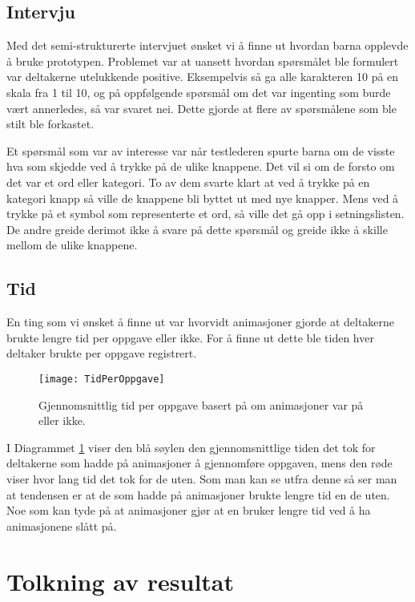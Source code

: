 \subsection{Intervju} 
 
Med det semi-strukturerte intervjuet ønsket vi å finne ut hvordan barna opplevde å bruke prototypen. Problemet var at uansett hvordan spørsmålet ble formulert var deltakerne utelukkende positive. Eksempelvis så ga alle karakteren 10 på en skala fra 1 til 10, og på oppfølgende spørsmål om det var ingenting som burde vært annerledes, så var svaret nei. Dette gjorde at flere av spørsmålene som ble stilt ble forkastet.  
 
Et spørsmål som var av interesse var når testlederen spurte barna om de visste hva som skjedde ved å trykke på de ulike knappene. Det vil si om de forsto om det var et ord eller kategori. To av dem svarte klart at ved å trykke på en kategori knapp så ville de knappene bli byttet ut med nye knapper. Mens ved å trykke på et symbol som representerte et ord, så ville det gå opp i setningslisten. De andre greide derimot ikke å svare på dette spørsmål og greide ikke å skille mellom de ulike knappene. 
 

\subsection{Tid} 
 
 
En ting som vi ønsket å finne ut var hvorvidt animasjoner gjorde at deltakerne brukte lengre tid per oppgave eller ikke. For å finne ut dette ble tiden hver deltaker brukte per oppgave registrert.  
 
 
\begin{figure}[ht!] 
\centering 
\texttt{[image: TidPerOppgave]} 
\caption{Gjennomsnittlig tid per oppgave basert på om animasjoner var på eller ikke.} 
\label{fig:DiagramTidPerOppgave} 
\end{figure} 
 
 
I Diagrammet \ref{fig:DiagramTidPerOppgave} viser den blå søylen den gjennomsnittlige tiden det tok for deltakerne som hadde på animasjoner å gjennomføre oppgaven, mens den røde viser hvor lang tid det tok for de uten. Som man kan se utfra denne så ser man at tendensen er at de som hadde på animasjoner brukte lengre tid en de uten. Noe som kan tyde på at animasjoner gjør at en bruker lengre tid ved å ha animasjonene slått på.  
 
 
 
\section{Tolkning av resultat} 
 

